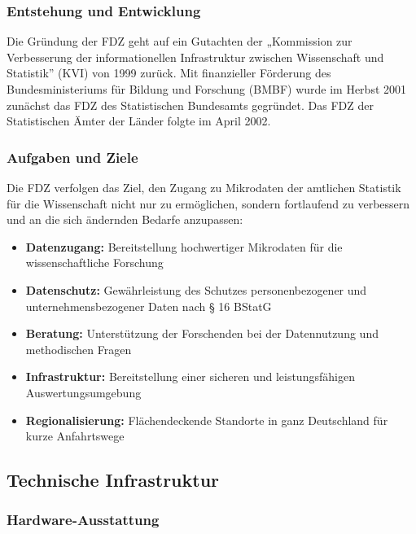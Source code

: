 \documentclass[
  ngerman,
  10pt,
  twocolumn]{article}
\providecommand{\tightlist}{%
  \setlength{\itemsep}{0pt}\setlength{\parskip}{0pt}}
\begin{document}
\subsubsection{Entstehung und
Entwicklung}\label{entstehung-und-entwicklung}

Die Gründung der FDZ geht auf ein Gutachten der „Kommission zur
Verbesserung der informationellen Infrastruktur zwischen Wissenschaft
und Statistik'' (KVI) von 1999 zurück. Mit finanzieller Förderung des
Bundesministeriums für Bildung und Forschung (BMBF) wurde im Herbst 2001
zunächst das FDZ des Statistischen Bundesamts gegründet. Das FDZ der
Statistischen Ämter der Länder folgte im April 2002.

\subsubsection{Aufgaben und Ziele}\label{aufgaben-und-ziele}

Die FDZ verfolgen das Ziel, den Zugang zu Mikrodaten der amtlichen
Statistik für die Wissenschaft nicht nur zu ermöglichen, sondern
fortlaufend zu verbessern und an die sich ändernden Bedarfe anzupassen:

\begin{itemize}
\tightlist
\item
  \textbf{Datenzugang:} Bereitstellung hochwertiger Mikrodaten für die
  wissenschaftliche Forschung
\item
  \textbf{Datenschutz:} Gewährleistung des Schutzes personenbezogener
  und unternehmensbezogener Daten nach § 16 BStatG
\item
  \textbf{Beratung:} Unterstützung der Forschenden bei der Datennutzung
  und methodischen Fragen
\item
  \textbf{Infrastruktur:} Bereitstellung einer sicheren und
  leistungsfähigen Auswertungsumgebung
\item
  \textbf{Regionalisierung:} Flächendeckende Standorte in ganz
  Deutschland für kurze Anfahrtswege
\end{itemize}

\subsection{Technische Infrastruktur}\label{technische-infrastruktur}

\subsubsection{Hardware-Ausstattung}\label{hardware-ausstattung}
\end{document}
